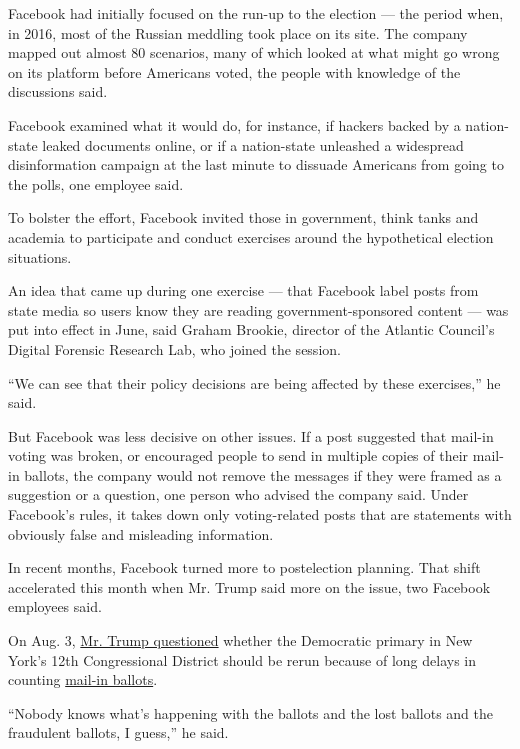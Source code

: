 Facebook had initially focused on the run-up to the election --- the
period when, in 2016, most of the Russian meddling took place on its
site. The company mapped out almost 80 scenarios, many of which looked
at what might go wrong on its platform before Americans voted, the
people with knowledge of the discussions said.

Facebook examined what it would do, for instance, if hackers backed by a
nation-state leaked documents online, or if a nation-state unleashed a
widespread disinformation campaign at the last minute to dissuade
Americans from going to the polls, one employee said.

To bolster the effort, Facebook invited those in government, think tanks
and academia to participate and conduct exercises around the
hypothetical election situations.

An idea that came up during one exercise --- that Facebook label posts
from state media so users know they are reading government-sponsored
content --- was put into effect in June, said Graham Brookie, director
of the Atlantic Council's Digital Forensic Research Lab, who joined the
session.

``We can see that their policy decisions are being affected by these
exercises,'' he said.

But Facebook was less decisive on other issues. If a post suggested that
mail-in voting was broken, or encouraged people to send in multiple
copies of their mail-in ballots, the company would not remove the
messages if they were framed as a suggestion or a question, one person
who advised the company said. Under Facebook's rules, it takes down only
voting-related posts that are statements with obviously false and
misleading information.

In recent months, Facebook turned more to postelection planning. That
shift accelerated this month when Mr. Trump said more on the issue, two
Facebook employees said.

On Aug. 3,
\href{https://www.nytimes3xbfgragh.onion/2020/08/03/us/politics/trump-mail-in-voting.html}{Mr.
Trump questioned} whether the Democratic primary in New York's 12th
Congressional District should be rerun because of long delays in
counting
\href{https://www.nytimes3xbfgragh.onion/interactive/2020/08/11/us/politics/vote-by-mail-us-states.html}{mail-in
ballots}.

``Nobody knows what's happening with the ballots and the lost ballots
and the fraudulent ballots, I guess,'' he said.

